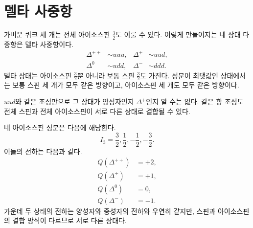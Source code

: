 \section{델타 사중항}

가벼운 쿼크 세 개는 전체 아이소스핀 \(\tfrac32\)도 이룰 수 있다. 이렇게 만들어지는 네 상태 다중항은 델타 사중항이다.
\begin{equation}
\begin{aligned}
\Delta^{++}&\sim uuu,
&
\Delta^{+}&\sim uud,
\\
\Delta^{0}&\sim udd,
&
\Delta^{-}&\sim ddd.
\end{aligned}
\end{equation}
델타 상태는 아이소스핀 \(\tfrac32\)뿐 아니라 보통 스핀 \(\tfrac32\)도 가진다. 성분이 최댓값인 상태에서는 보통 스핀 세 개가 모두 같은 방향이고, 아이소스핀 세 개도 모두 같은 방향이다.

\(uud\)와 같은 조성만으로 그 상태가 양성자인지 \(\Delta^+\)인지 알 수는 없다. 같은 향 조성도 전체 스핀과 전체 아이소스핀이 서로 다른 상태로 결합될 수 있다.

\begin{classroomqa}
\end{classroomqa}

\begin{classroomqa}
\end{classroomqa}

네 아이소스핀 성분은 다음에 해당한다.
\begin{equation}
I_3=\frac32,\frac12,-\frac12,-\frac32.
\end{equation}
이들의 전하는 다음과 같다.
\begin{align}
Q(\Delta^{++})&=+2,\\
Q(\Delta^{+})&=+1,\\
Q(\Delta^{0})&=0,\\
Q(\Delta^{-})&=-1.
\end{align}
가운데 두 상태의 전하는 양성자와 중성자의 전하와 우연히 같지만, 스핀과 아이소스핀의 결합 방식이 다르므로 서로 다른 상태다.

